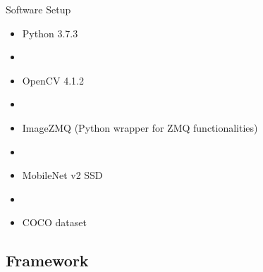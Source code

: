 \documentclass{beamer}
\begin{document}
\begin{frame}{Software Setup}
\begin{itemize}
\item Python 3.7.3
\item[]
\item OpenCV 4.1.2
\item[]
\item ImageZMQ (Python wrapper for ZMQ functionalities)
\item[]
\item MobileNet v2 SSD
\item[]
\item COCO dataset
\end{itemize}
\end{frame}

\subsection{Framework}
\end{document}
